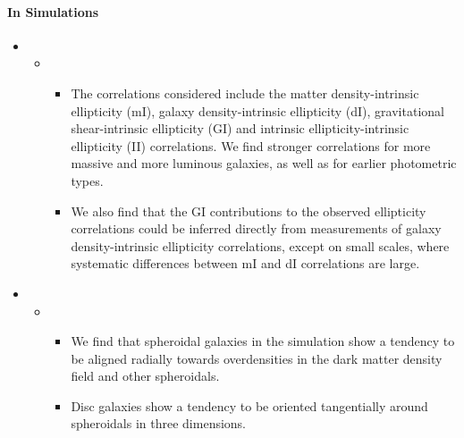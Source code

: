 \documentclass[letterpaper,10pt,english]{sphinxmanual}
\begin{document}
\paragraph{In Simulations}
\label{\detokenize{resource/astro/reference/wl_intrinsic_alignment:in-simulations}}\begin{itemize}
\item {} 
\begin{itemize}
\item {} 
\begin{itemize}
\item {} 
The correlations considered include the matter
density-intrinsic ellipticity (mI), galaxy density-intrinsic
ellipticity (dI), gravitational shear-intrinsic ellipticity
(GI) and intrinsic ellipticity-intrinsic ellipticity (II)
correlations. We find stronger correlations for more massive
and more luminous galaxies, as well as for earlier photometric
types.

\item {} 
We also find that the GI contributions to the observed
ellipticity correlations could be inferred directly from
measurements of galaxy density-intrinsic ellipticity
correlations, except on small scales, where systematic
differences between mI and dI correlations are large.

\end{itemize}

\end{itemize}

\item {} 
\begin{itemize}
\item {} 
\begin{itemize}
\item {} 
We find that spheroidal galaxies in the simulation show a
tendency to be aligned radially towards overdensities in the
dark matter density field and other spheroidals.

\item {} 
Disc galaxies show a tendency to be oriented tangentially
around spheroidals in three dimensions.

\end{itemize}


\end{itemize}
\end{itemize}
\end{document}
